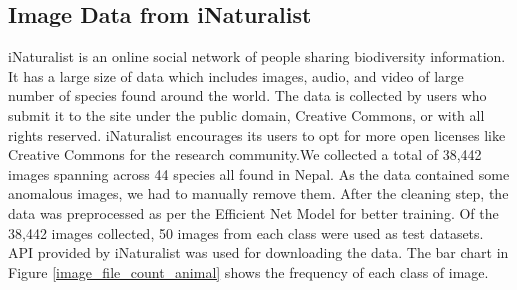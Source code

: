 \documentclass[fleqn, 10pt, twoside]{IOEGC}
\begin{document}
\subsection{Image Data from iNaturalist}
iNaturalist is an online social network of people sharing biodiversity information. It has a large size of data which includes images, audio, and video of large number of species found around the world. The data is collected by users who submit it to the site under the public domain, Creative Commons, or with all rights reserved. iNaturalist encourages its users to opt for more open licenses like Creative Commons for the research community.We collected a total of 38,442 images spanning across 44 species all found in Nepal. As the data contained some anomalous images, we had to manually remove them. After the cleaning step, the data was preprocessed as per the Efficient Net Model for better training. Of the 38,442 images collected, 50 images from each class were used as test datasets.
API provided by iNaturalist was used for downloading the data. The bar chart in Figure \ref{image_file_count_animal} shows the frequency of each class of image.
\end{document}
